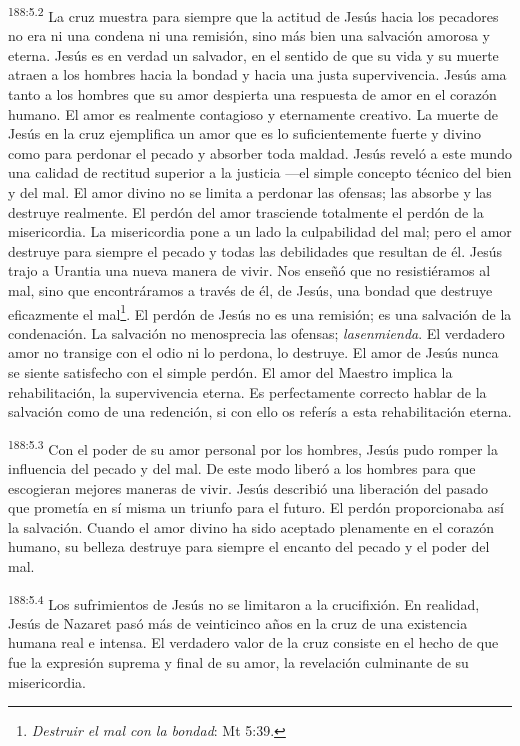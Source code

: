 \par
\textsuperscript{188:5.2} La cruz muestra para siempre que la actitud de Jesús hacia los pecadores no era ni una condena ni una remisión, sino más bien una salvación amorosa y eterna. Jesús es en verdad un salvador, en el sentido de que su vida y su muerte atraen a los hombres hacia la bondad y hacia una justa supervivencia. Jesús ama tanto a los hombres que su amor despierta una respuesta de amor en el corazón humano. El amor es realmente contagioso y eternamente creativo. La muerte de Jesús en la cruz ejemplifica un amor que es lo suficientemente fuerte y divino como para perdonar el pecado y absorber toda maldad. Jesús reveló a este mundo una calidad de rectitud superior a la justicia ---el simple concepto técnico del bien y del mal. El amor divino no se limita a perdonar las ofensas; las absorbe y las destruye realmente. El perdón del amor trasciende totalmente el perdón de la misericordia. La misericordia pone a un lado la culpabilidad del mal; pero el amor destruye para siempre el pecado y todas las debilidades que resultan de él. Jesús trajo a Urantia una nueva manera de vivir. Nos enseñó que no resistiéramos al mal, sino que encontráramos a través de él, de Jesús, una bondad que destruye eficazmente el mal\footnote{\textit{Destruir el mal con la bondad}: Mt 5:39.}. El perdón de Jesús no es una remisión; es una salvación de la condenación. La salvación no menosprecia las ofensas; \textit{lasenmienda}. El verdadero amor no transige con el odio ni lo perdona, lo destruye. El amor de Jesús nunca se siente satisfecho con el simple perdón. El amor del Maestro implica la rehabilitación, la supervivencia eterna. Es perfectamente correcto hablar de la salvación como de una redención, si con ello os referís a esta rehabilitación eterna.

\par
\textsuperscript{188:5.3} Con el poder de su amor personal por los hombres, Jesús pudo romper la influencia del pecado y del mal. De este modo liberó a los hombres para que escogieran mejores maneras de vivir. Jesús describió una liberación del pasado que prometía en sí misma un triunfo para el futuro. El perdón proporcionaba así la salvación. Cuando el amor divino ha sido aceptado plenamente en el corazón humano, su belleza destruye para siempre el encanto del pecado y el poder del mal.

\par
\textsuperscript{188:5.4} Los sufrimientos de Jesús no se limitaron a la crucifixión. En realidad, Jesús de Nazaret pasó más de veinticinco años en la cruz de una existencia humana real e intensa. El verdadero valor de la cruz consiste en el hecho de que fue la expresión suprema y final de su amor, la revelación culminante de su misericordia.

